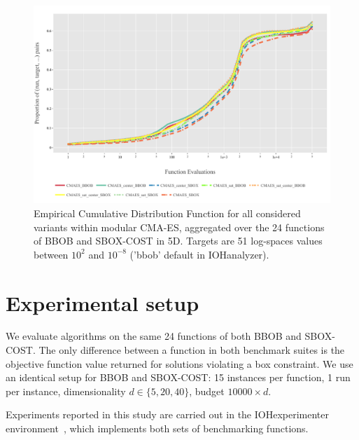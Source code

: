 \documentclass[sigconf=true, nonacm=false, review=true, anonymous = false,screen=true]{acmart}
\begin{document}
\begin{figure}[!tb]
 \centering
 \includegraphics[width=.95\linewidth,trim=1mm 5mm 13mm 9mm,clip]{Figures/ECDF_5D_CMAESS.pdf}
 \caption{Empirical Cumulative Distribution Function for all considered variants within modular CMA-ES, aggregated over the 24 functions of BBOB and SBOX-COST in 5D. Targets are 51 log-spaces values between $10^2$ and $10^{-8}$ ('bbob' default in IOHanalyzer).}\label{fig:res_ecdf}
\end{figure}
\section{Experimental setup}
We evaluate algorithms on the same 24 functions of both BBOB and SBOX-COST. The only difference between a function in both benchmark suites is the objective function value returned for solutions violating a box constraint.
We use an identical setup for BBOB and SBOX-COST: 15 instances per function, 1 run per instance, dimensionality $d\in\{5, 20, 40\}$, budget $10000\times d$.

Experiments reported in this study are carried out in the IOHex\-pe\-ri\-men\-ter environment~\cite{de2021iohexperimenter}, which implements both sets of benchmarking functions. 
\end{document}

